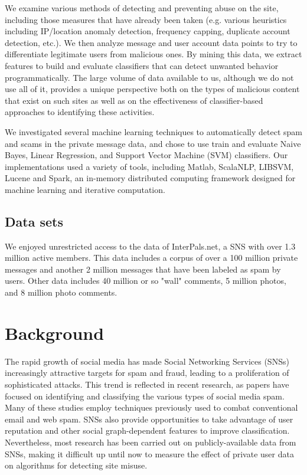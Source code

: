 \documentclass[preprint]{acm_proc_article-sp}
\begin{document}
We examine various methods of detecting and preventing abuse
on the site, including those measures that have already been taken
(e.g. various heuristics including IP/location anomaly detection,
frequency capping, duplicate account detection, etc.). We then analyze 
message and user account data points to try to differentiate legitimate users
from malicious ones. By mining this data, we extract features 
to build and evaluate classifiers that can detect unwanted behavior 
programmatically. The large volume of data available to us, although we do 
not use all of it, provides a unique perspective both on the types of
malicious content that exist on such sites as well as on the
effectiveness of classifier-based approaches to identifying
these activities.

We investigated several machine learning techniques to automatically 
detect spam and scams in the private message data, and chose to use 
train and evaluate Naive Bayes, Linear Regression, and 
Support Vector Machine (SVM) classifiers. Our implementations used 
a variety of tools, including Matlab, ScalaNLP, LIBSVM, Lucene and Spark, 
an in-memory distributed computing framework designed for machine 
learning and iterative computation.


\subsection{Data sets}

We enjoyed unrestricted access to the data of InterPals.net, a SNS with 
over 1.3 million active members. This data includes a corpus of over a 
100 million private messages and another 2 million messages that have been 
labeled as spam by users. Other data includes 40 million or so "wall" 
comments, 5 million photos, and 8 million photo comments. 


\section{Background} 

The rapid growth of social media has made Social Networking Services (SNSs) increasingly attractive targets for spam and fraud, leading to a proliferation of sophisticated attacks. This trend is reflected in recent research, as papers have focused on identifying and classifying the various types of social media spam. Many of these studies employ techniques previously used to combat conventional email and web spam. SNSs also provide opportunities to take advantage of user reputation and other social graph-dependent features to improve classification. Nevertheless, most research has been carried out on publicly-available data from SNSs, making it difficult up until now to measure the effect of private user data on algorithms for detecting site misuse.
\end{document}
